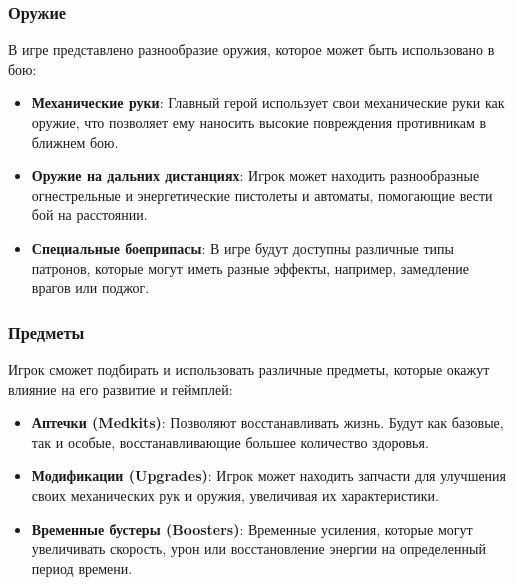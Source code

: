 \documentclass{article}
\begin{document}
\subsubsection{Оружие}
В игре представлено разнообразие оружия, которое может быть использовано в бою:
\begin{itemize}
    \item \textbf{Механические руки}: Главный герой использует свои механические руки как оружие, что позволяет ему наносить высокие повреждения противникам в ближнем бою.
    \item \textbf{Оружие на дальних дистанциях}: Игрок может находить разнообразные огнестрельные и энергетические пистолеты и автоматы, помогающие вести бой на расстоянии.
    \item \textbf{Специальные боеприпасы}: В игре будут доступны различные типы патронов, которые могут иметь разные эффекты, например, замедление врагов или поджог.
\end{itemize}
\subsubsection{Предметы}
Игрок сможет подбирать и использовать различные предметы, которые окажут влияние на его развитие и геймплей:
\begin{itemize}
    \item \textbf{Аптечки (Medkits)}: Позволяют восстанавливать жизнь. Будут как базовые, так и особые, восстанавливающие большее количество здоровья.
    \item \textbf{Модификации (Upgrades)}: Игрок может находить запчасти для улучшения своих механических рук и оружия, увеличивая их характеристики.
    \item \textbf{Временные бустеры (Boosters)}: Временные усиления, которые могут увеличивать скорость, урон или восстановление энергии на определенный период времени.
\end{itemize}
\end{document}
